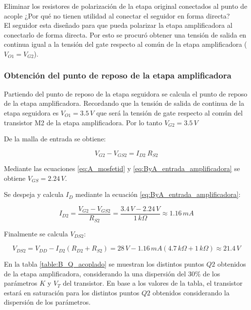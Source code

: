 \documentclass[10pt,spanish,a4paper,notitlepage]{article}
\begin{document}
{\color{OliveGreen} 
Eliminar los resistores de polarización de la etapa original conectados 
al punto de acople ¿Por qué no tienen utilidad al conectar el seguidor en 
forma directa?}\\

El seguidor esta diseñado para que pueda polarizar la etapa amplificadora
al conectarlo de forma directa. Por esto se procuró obtener una tensión
de salida en continua igual a la tensión del gate respecto al común de la
etapa amplificadora ($V_{O1} = V_{G2}$). 

\subsubsection{Obtención del punto de reposo de la etapa amplificadora}

Partiendo del punto de reposo de la etapa seguidora se calcula el punto
de reposo de la etapa amplificadora. Recordando que la tensión de salida
de continua de la etapa seguidora es $V_{O1} = 3.5\,\unit{V}$ que será
la tensión de gate respecto al común del transistor M2 de la etapa
amplificadora. Por lo tanto $V_{G2} = 3.5\,\unit{V}$

De la malla de entrada se obtiene:

\begin{equation}
V_{G2} - V_{GS2} = I_{D2}\ R_{S2}
\label{eq:ByA_entrada_amplificadora}
\end{equation}

Mediante las ecuaciones \ref{eq:A_mosfetid} y \ref{eq:ByA_entrada_amplificadora}
se obtiene $V_{GS} = 2.24\,\unit{V}$.

Se despeja y calcula $I_D$ mediante la ecuación \ref{eq:ByA_entrada_amplificadora}:

\[ \displaystyle I_{D2} = \frac{V_{G2} - V_{GS2}}{R_{S2}} = 
\frac{3.4\,\unit{V} - 2.24\,\unit{V}}{1\,\unit{k\Omega}}
\approx 1.16\,\unit{mA} \]

Finalmente se calcula $V_{DS2}$:

\[ \displaystyle V_{DS2} = V_{DD} - I_{D2}(R_{D2} + R_{S2})
= 28\,\unit{V} - 1.16\,\unit{mA} (4.7\,\unit{k\Omega} + 1\,\unit{k\Omega})
\approx 21.4\,\unit{V} \]

En la tabla \ref{table:B_Q_acoplado} se muestran los distintos puntos
$Q2$ obtenidos de la etapa amplificadora, considerando la una dispersión del 30\% de los parámetros $K$ y $V_T$ del transistor.
En base a los valores de la tabla, el transistor estará en saturación
para los distintos puntos $Q2$ obtenidos considerando la dispersión
de los parámetros.
\end{document}
